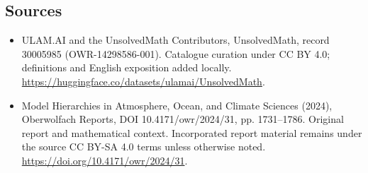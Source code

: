 \documentclass[11pt]{article}
\begin{document}
\subsection{Sources}
\begin{itemize}
\item[\hypertarget{source:30005985:1}{S1}] ULAM.AI and the UnsolvedMath Contributors, UnsolvedMath, record 30005985 (OWR-14298586-001). Catalogue curation under CC BY 4.0; definitions and English exposition added locally.
\url{https://huggingface.co/datasets/ulamai/UnsolvedMath}.
\item[\hypertarget{source:30005985:2}{S2}] Model Hierarchies in Atmosphere, Ocean, and Climate Sciences (2024), Oberwolfach Reports, DOI 10.4171/owr/2024/31, pp. 1731--1786. Original report and mathematical context. Incorporated report material remains under the source CC BY-SA 4.0 terms unless otherwise noted.
\url{https://doi.org/10.4171/owr/2024/31}.
\end{itemize}
\label{end:30005985}
\end{document}

